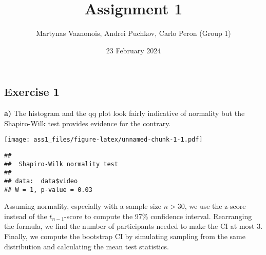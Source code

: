 \documentclass[
]{article}
\title{Assignment 1}
\author{Martynas Vaznonois, Andrei Puchkov, Carlo Peron (Group 1)}
\date{23 February 2024}
\newenvironment{Shaded}{\begin{snugshade}}{\end{snugshade}}
\newcommand{\AttributeTok}[1]{\textcolor[rgb]{0.13,0.29,0.53}{#1}}
\newcommand{\DecValTok}[1]{\textcolor[rgb]{0.00,0.00,0.81}{#1}}
\newcommand{\FunctionTok}[1]{\textcolor[rgb]{0.13,0.29,0.53}{\textbf{#1}}}
\newcommand{\NormalTok}[1]{#1}
\newcommand{\SpecialCharTok}[1]{\textcolor[rgb]{0.81,0.36,0.00}{\textbf{#1}}}
\newcommand{\StringTok}[1]{\textcolor[rgb]{0.31,0.60,0.02}{#1}}
\begin{document}
\maketitle

\hypertarget{exercise-1}{%
\subsection{Exercise 1}\label{exercise-1}}

\textbf{a)} The histogram and the qq plot look fairly indicative of
normality but the Shapiro-Wilk test provides evidence for the contrary.

\begin{Shaded}
\end{Shaded}

\texttt{[image: ass1\_files/figure-latex/unnamed-chunk-1-1.pdf]}

\begin{Shaded}
\end{Shaded}

\begin{verbatim}
## 
##  Shapiro-Wilk normality test
## 
## data:  data$video
## W = 1, p-value = 0.03
\end{verbatim}

Assuming normality, especially with a sample size \(n>30\), we use the
z-score instead of the \(t_{n-1}\)-score to compute the 97\% confidence
interval. Rearranging the formula, we find the number of participants
needed to make the CI at most 3. Finally, we compute the bootstrap CI by
simulating sampling from the same distribution and calculating the mean
test statistics.
\end{document}
